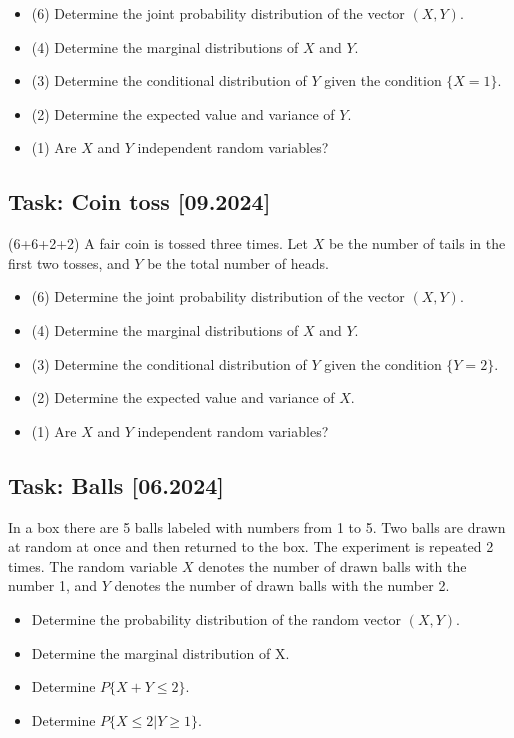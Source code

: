 \documentclass[a4paper, 12pt]{article}
\begin{document}
\begin{itemize}
    \item  [a)] (6) Determine the joint probability distribution of the vector $(X, Y)$.
\item  [b)] (4) Determine the marginal distributions of $X$ and $Y$.
\item  [c)] (3) Determine the conditional distribution of $Y$ given the condition $\{X = 1\}$.
\item  [d)] (2) Determine the expected value and variance of $Y$.
\item  [e)] (1) Are $X$ and $Y$ independent random variables?
\end{itemize}


\subsection*{Task: Coin toss [09.2024]}

(6+6+2+2) A fair coin is tossed three times. Let $X$ be the number of tails in the first two tosses, and $Y$ be the total number of heads.


\begin{itemize}
\item  [a)] (6) Determine the joint probability distribution of the vector $(X, Y)$.
\item  [b)] (4) Determine the marginal distributions of $X$ and $Y$.
\item  [c)] (3) Determine the conditional distribution of $Y$ given the condition $\{Y = 2\}$.
\item  [d)] (2) Determine the expected value and variance of $X$.
\item  [e)] (1) Are $X$ and $Y$ independent random variables?
\end{itemize}


\subsection*{Task: Balls [06.2024]}

In a box there are 5 balls labeled with numbers from 1 to 5. Two balls are drawn at random at once and then returned to the box. The experiment is repeated 2 times. The random variable $X$ denotes the number of drawn balls with the number 1, and $Y$ denotes the number of drawn balls with the number 2.

\begin{itemize}
 \item   [A)] Determine the probability distribution of the random vector $(X, Y)$.
\item [B)] Determine the marginal distribution of X.
\item [C)] Determine $P\{X + Y \leq 2\}$.
\item [D)] Determine $P\{X \leq 2 | Y \geq 1\}$.
\end{itemize}
\end{document}
